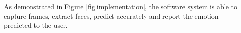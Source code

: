\documentclass[master]{thesis-uestc}
\begin{document}
As demonstrated in Figure \ref{fig:implementation}, the software system is able to capture frames, extract faces, predict accurately and report the emotion predicted to the user.  
\begin{figure}%
\centering
{}%
\hspace{8pt}%
 \\
%
\hspace{8pt}%
 \\

\end{figure}
\end{document}
